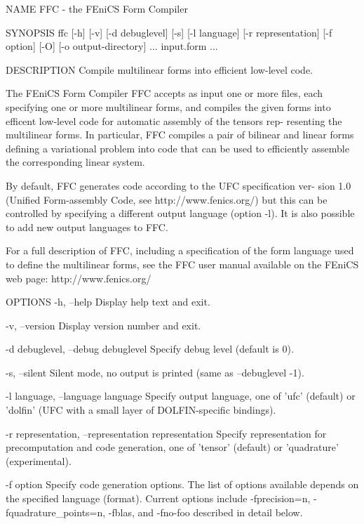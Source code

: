 NAME
       FFC - the FEniCS Form Compiler


SYNOPSIS
       ffc [-h] [-v] [-d debuglevel] [-s] [-l language] [-r representation]
       [-f option] [-O] [-o output-directory] ... input.form ...


DESCRIPTION
       Compile multilinear forms into efficient low-level code.

       The FEniCS Form Compiler FFC accepts as input one or more  files,  each
       specifying  one or more multilinear forms, and compiles the given forms
       into efficent low-level code for automatic assembly of the tensors rep-
       resenting  the multilinear forms. In particular, FFC compiles a pair of
       bilinear and linear forms defining a variational problem into code that
       can be used to efficiently assemble the corresponding linear system.

       By  default, FFC generates code according to the UFC specification ver-
       sion 1.0 (Unified Form-assembly Code, see  http://www.fenics.org/)  but
       this  can  be  controlled  by  specifying  a  different output language
       (option -l). It is also possible to add new output languages to FFC.

       For a full description of FFC, including a specification  of  the  form
       language  used to define the multilinear forms, see the FFC user manual
       available on the FEniCS web page: http://www.fenics.org/


OPTIONS
       -h, --help
              Display help text and exit.

       -v, --version
              Display version number and exit.

       -d debuglevel, --debug debuglevel
              Specify debug level (default is 0).

       -s, --silent
              Silent mode, no output is printed (same as --debuglevel -1).

       -l language, --language language
              Specify output language, one of 'ufc' (default) or 'dolfin' (UFC
              with a small layer of DOLFIN-specific bindings).

       -r representation, --representation representation
              Specify  representation  for precomputation and code generation,
              one of 'tensor' (default) or 'quadrature' (experimental).

       -f option
              Specify code generation options. The list of  options  available
              depends  on  the  specified  language  (format). Current options
              include   -fprecision=n,   -fquadrature_points=n,   -fblas,  and
              -fno-foo described in detail below.
        
